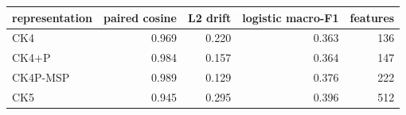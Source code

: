 \begin{tabular}{@{}lrrrr@{}}
\toprule
\textbf{representation} & \textbf{paired cosine} & \textbf{L2 drift} & \textbf{logistic macro-F1} & \textbf{features} \\
\midrule
CK4 & 0.969 & 0.220 & 0.363 & 136 \\
CK4+P & 0.984 & 0.157 & 0.364 & 147 \\
CK4P-MSP & 0.989 & 0.129 & 0.376 & 222 \\
CK5 & 0.945 & 0.295 & 0.396 & 512 \\
\bottomrule
\end{tabular}
